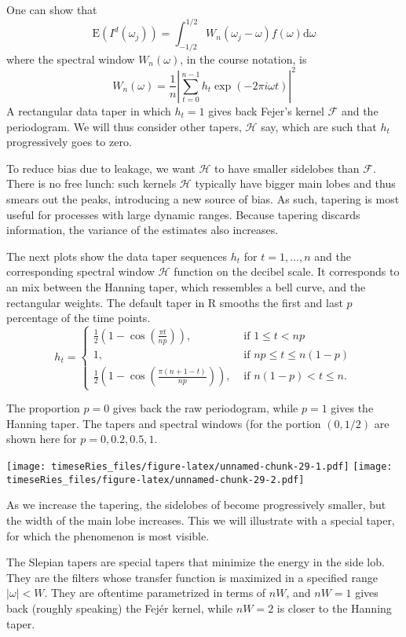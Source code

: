 \documentclass[]{book}
\begin{document}
One can show that
\[\mathrm{E}\left(I^d(\omega_j)\right) = \int_{-1/2}^{1/2}W_n(\omega_j-\omega)f(\omega)\mathrm{d} \omega\]
where the spectral window \(W_n(\omega)\), in the course notation, is
\[W_n(\omega) = \frac{1}{n}\left| \sum_{t=0}^{n-1} h_t \exp(-2\pi i \omega t) \right|^2\]
A rectangular data taper in which \(h_t = 1\) gives back Fejer's kernel
\(\mathcal{F}\) and the periodogram. We will thus consider other tapers,
\(\mathcal{H}\) say, which are such that \(h_t\) progressively goes to
zero.

To reduce bias due to leakage, we want \(\mathcal{H}\) to have smaller
sidelobes than \(\mathcal{F}\). There is no free lunch: such kernels
\(\mathcal{H}\) typically have bigger main lobes and thus smears out the
peaks, introducing a new source of bias. As such, tapering is most
useful for processes with large dynamic ranges. Because tapering
discards information, the variance of the estimates also increases.

The next plots show the data taper sequences \(h_t\) for
\(t=1, \ldots, n\) and the corresponding spectral window \(\mathcal{H}\)
function on the decibel scale. It corresponds to an mix between the
Hanning taper, which ressembles a bell curve, and the rectangular
weights. The default taper in R smooths the first and last \(p\)
percentage of the time points. \[
h_t = 
\begin{cases}
\frac{1}{2}\left(1-\cos\left(\frac{\pi t}{np}\right)\right), & \text{ if } 1\le t< np
\\
1,  &\text{ if } np \le t \le n(1-p)
\\
\frac{1}{2}\left(1-\cos\left(\frac{\pi (n+1-t)}{np}\right)\right), &\text{ if }  n(1-p)<t\le n.
\end{cases}
\]

The proportion \(p=0\) gives back the raw periodogram, while \(p=1\)
gives the Hanning taper. The tapers and spectral windows (for the
portion \((0,1/2)\) are shown here for \(p=0, 0.2, 0.5, 1\).

\texttt{[image: timeseRies\_files/figure-latex/unnamed-chunk-29-1.pdf]}
\texttt{[image: timeseRies\_files/figure-latex/unnamed-chunk-29-2.pdf]}

As we increase the tapering, the sidelobes of become progressively
smaller, but the width of the main lobe increases. This we will
illustrate with a special taper, for which the phenomenon is most
visible.

The Slepian tapers are special tapers that minimize the energy in the
side lob. They are the filters whose transfer function is maximized in a
specified range \(|\omega|< W\). They are oftentime parametrized in
terms of \(nW\), and \(nW=1\) gives back (roughly speaking) the Fejér
kernel, while \(nW=2\) is closer to the Hanning taper.
\end{document}
